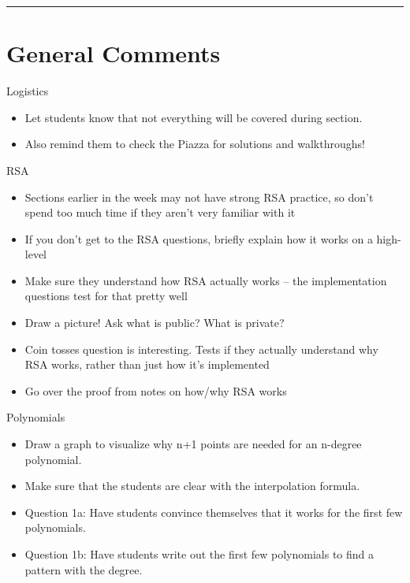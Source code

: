 \documentclass{exam}
\title{}
\date{Polynomials, Secret Sharing, Erasure Errors, General Errors, Self Reference}
\begin{document}
\maketitle
\rule{\textwidth}{0.15em}
\fontsize{12}{15}\selectfont
\thispagestyle{empty}

\section{General Comments}
\begin{questions}
	\item Logistics
	\begin{itemize}
		\item Let students know that not everything will be covered during section. 
		\item Also remind them to check the Piazza for solutions and walkthroughs!
	\end{itemize}

	\item RSA
	\begin{itemize}
		\item Sections earlier in the week may not have strong RSA practice, so don’t spend too much time if they aren’t very familiar with it
		\item If you don’t get to the RSA questions, briefly explain how it works on a high-level
		\item Make sure they understand how RSA actually works – the implementation questions test for that pretty well
		\item Draw a picture! Ask what is public? What is private?
		\item Coin tosses question is interesting. Tests if they actually understand why RSA works, rather than just how it’s implemented
		\item Go over the proof from notes on how/why RSA works
	\end{itemize}


	\item Polynomials
	\begin{itemize}
		\item Draw a graph to visualize why n+1 points are needed for an n-degree polynomial.
		\item Make sure that the students are clear with the interpolation formula.
		\item Question 1a: Have students convince themselves that it works for the first few polynomials.
		\item Question 1b: Have students write out the first few polynomials to find a pattern with the degree.
	\end{itemize}


\end{questions}
\end{document}
